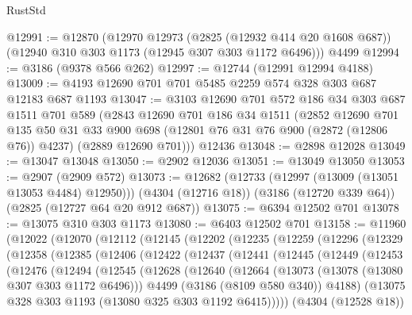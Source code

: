 \begin{lexlean}{RustStd}
\begin{coremodule}
{\begin{coremodule}
{{{{{{{{{{{{{{{{{{{{@12991 := @12870
    (@12970
      @12973
      (@2825 (@12932 @414 @20 @1608 @687))
      (@12940 @310 @303 @1173 (@12945 @307 @303 @1172 @6496)))
    @4499
@12994 := @3186 (@9378 @566 @262)
@12997 := @12744 (@12991 @12994 @4188)
@13009 := @4193 @12690 @701 @701 @5485 @2259 @574 @328 @303 @687 @12183 @687 @1193
@13047 := @3103
    @12690
    @701
    @572
    @186
    @34
    @303
    @687
    @1511
    @701
    @589
    (@2843
      @12690
      @701
      @186
      @34
      @1511
      (@2852
        @12690
        @701
        @135
        @50
        @31
        @33
        @900
        @698
        (@12801 @76 @31 @76 @900 (@2872 (@12806 @76)) @4237)
        (@2889 @12690 @701)))
    @12436
@13048 := @2898 @12028
@13049 := @13047 @13048
@13050 := @2902 @12036
@13051 := @13049 @13050
@13053 := @2907 (@2909 @572)
@13073 := @12682
    (@12733 (@12997 (@13009 (@13051 @13053 @4484) @12950)))
    (@4304 (@12716 @18))
    (@3186 (@12720 @339 @64))
    (@2825 (@12727 @64 @20 @912 @687))
@13075 := @6394 @12502 @701
@13078 := @13075 @310 @303 @1173
@13080 := @6403 @12502 @701
@13158 := @11960
    (@12022
      (@12070
        (@12112
          (@12145
            (@12202
              (@12235
                (@12259
                  (@12296
                    (@12329
                      (@12358
                        (@12385
                          (@12406
                            (@12422
                              (@12437
                                (@12441
                                  (@12445
                                    (@12449
                                      (@12453
                                        (@12476
                                          (@12494
                                            (@12545
                                              (@12628
                                                (@12640
                                                  (@12664
                                                    (@13073 (@13078 (@13080 @307 @303 @1172 @6496)))
                                                    @4499
                                                    (@3186 (@8109 @580 @340))
                                                    @4188)
                                                  (@13075
                                                    @328
                                                    @303
                                                    @1193
                                                    (@13080 @325 @303 @1192 @6415)))))
                                            (@4304 (@12528 @18))
}}}}}}}}}}}}}}}}}}}}
\end{coremodule}}
\end{coremodule}
\end{lexlean}
